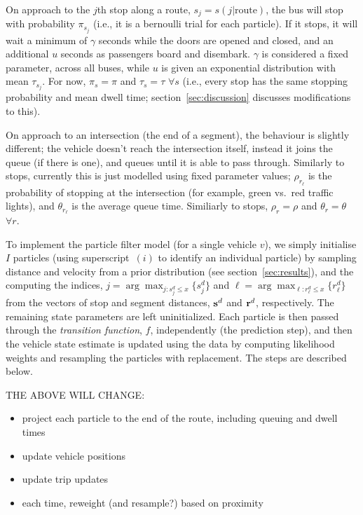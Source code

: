\documentclass[draftcls,a4paper,onecolumn]{IEEEtran}\usepackage[]{graphicx}\usepackage[]{color}
\begin{document}
On approach to the $j$th stop along a route, 
$s_j = s(j | \text{route})$,
the bus will stop with probability $\pi_{s_j}$ 
(i.e., it is a bernoulli trial for each particle).
If it stops, it will wait a minimum of $\gamma$ seconds 
while the doors are opened and closed,
and an additional $u$ seconds as passengers board and disembark.
$\gamma$ is considered a fixed parameter, across all buses, 
while $u$ is given an exponential distribution with mean $\tau_{s_j}$.
For now, $\pi_s = \pi$ and $\tau_s = \tau$ $\forall s$
(i.e., every stop has the same stopping probability and mean dwell time; 
section~\ref{sec:discussion} discusses modifications to this).

On approach to an intersection (the end of a segment),
the behaviour is slightly different;
the vehicle doesn't reach the intersection itself, instead it joins the queue
(if there is one), and queues until it is able to pass through.
Similarly to stops, currently this is just modelled using fixed parameter values;
$\rho_{r_\ell}$ is the probability of stopping at the intersection
(for example, green vs.\ red traffic lights),
and $\theta_{r_\ell}$ is the average queue time.
Similiarly to stops, $\rho_r = \rho$ and $\theta_r = \theta$ $\forall r$.


To implement the particle filter model (for a single vehicle $v$), 
we simply initialise $I$ particles 
(using superscript~${(i)}$ to identify an individual particle)
by sampling distance and velocity from a prior distribution
(see section~\ref{sec:results}), 
and the computing the indices,
$j = \arg\max_{j:s_j^d \leq x} \{s_j^d\}$ 
and $\ell = \arg\max_{\ell:r_\ell^d \leq x} \{r_\ell^d\}$ from the 
vectors of stop and segment distances, $\mathbf{s}^d$ and $\mathbf{r}^d$, respectively.
The remaining state parameters are left uninitialized.
Each particle is then passed through the \emph{transition function}, $f$,
independently (the prediction step),
and then the vehicle state estimate is updated 
using the data by computing likelihood weights
and resampling the particles with replacement.
The steps are described below.

THE ABOVE WILL CHANGE:
\begin{itemize}
\item project each particle to the end of the route,
  including queuing and dwell times
\item update vehicle positions
\item update trip updates
\item each time, reweight (and resample?) based on proximity
\end{itemize}
\end{document}
